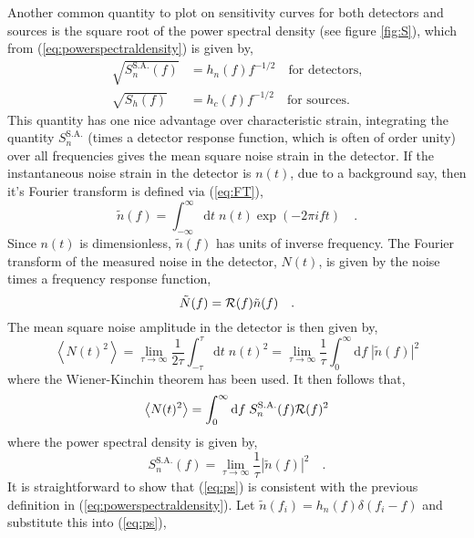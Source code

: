 Another common quantity to plot on sensitivity curves for both detectors and sources is the square root of the power spectral density (see figure \ref{fig:S}), which from (\ref{eq:powerspectraldensity}) is given by,
\begin{eqnarray}\label{eq:temp1} \sqrt{S^{\textrm{S.A.}}_{n}(f)}&=h_{n}(f)f^{-1/2} \quad\textrm{for detectors,} \nonumber \\
\sqrt{S_{h}(f)}&=h_{c}(f)f^{-1/2} \quad\textrm{for sources.}\end{eqnarray}
This quantity has one nice advantage over characteristic strain, integrating the quantity $S^{\textrm{S.A.}}_{n}$ (times a detector response function, which is often of order unity) over all frequencies gives the mean square noise strain in the detector. If the instantaneous noise strain in the detector is $n(t)$, due to a background say, then it's Fourier transform is defined via (\ref{eq:FT}),
\begin{equation}\label{eq:FT} \tilde{n}(f)=\int_{-\infty}^{\infty}\textrm{d}t\; n(t)\exp \left(-2\pi ift\right) \quad . \end{equation}
Since $n(t)$ is dimensionless, $\tilde{n}(f)$ has units of inverse frequency. The Fourier transform of the measured noise in the detector, $N(t)$, is given by the noise times a frequency response function,
\begin{equation} \tilde{N}(f)={\cal{R}}(f)\tilde{n}(f)\quad . \end{equation}
The mean square noise amplitude in the detector is then given by,
\begin{equation} \left< N(t)^{2} \right> = \lim_{\tau \rightarrow \infty} \frac{1}{2\tau} \int_{-\tau}^{\tau}\textrm{d}t\;n(t)^{2}=\lim_{\tau\rightarrow\infty}\frac{1}{\tau}\int_{0}^{\infty}\textrm{d}f\;\left|\tilde{n}(f)\right|^{2} \end{equation}
where the Wiener-Kinchin theorem has been used. It then follows that,
\begin{equation}\label{eq:meansquare} \left< N(t)^{2} \right> = \int_{0}^{\infty}\textrm{d}f\; S^{\textrm{S.A.}}_{n}(f){\cal{R}}(f)^{2} \end{equation}
where the power spectral density is given by,
\begin{equation}\label{eq:ps} S^{\textrm{S.A.}}_{n}(f)=\lim_{\tau\rightarrow\infty}\frac{1}{\tau}\left|\tilde{n}(f)\right|^{2} \quad . \end{equation}
It is straightforward to show that (\ref{eq:ps}) is consistent with the previous definition in (\ref{eq:powerspectraldensity}). Let $\tilde{n}(f_{i})=h_{n}(f)\delta (f_{i}-f)$ and substitute this into (\ref{eq:ps}),
